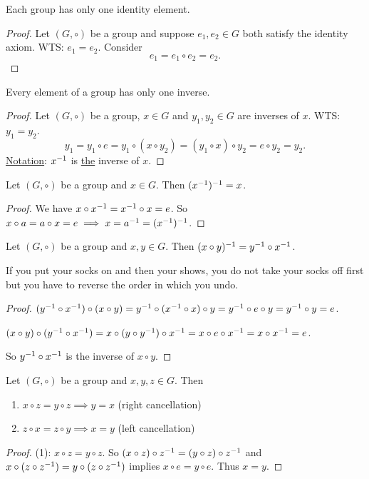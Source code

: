 \documentclass[]{article}
\begin{document}
\begin{proposition}
	Each group has only one identity element.
\end{proposition}
\begin{proof}
	Let $(G,\circ)$ be a group and suppose $e_1,e_2\in G$ both satisfy the identity axiom.
	WTS: $e_1 = e_2$.
	Consider $$e_1 = e_1\circ e_2 = e_2.$$
\end{proof}
\begin{proposition}
	Every element of a group has only one inverse.
\end{proposition}
\begin{proof}
	Let $(G,\circ)$ be a group, $x\in G$ and $y_1,y_2\in G$ are inverses of $x$.
	WTS: $y_1 = y_2$.
	$$y_1= y_1\circ e =y_1\circ (x\circ y_2) = (y_1\circ x)\circ y_2 = e\circ y_2 = y_2.$$
	\ul{Notation}: $x^{-1}$ is \ul{the} inverse of $x$.
\end{proof}
\begin{proposition}
	Let $(G,\circ)$ be a group and $x\in G$. Then $(x^{-1})^{-1} = x$.
\end{proposition}
\begin{proof}
	We have $x\circ x^{-1} = x^{-1} \circ x = e$. So $x\circ a = a\circ x = e \implies x = a^{-1} = (x^{-1})^{-1}$.
\end{proof}
\begin{proposition}
	Let $(G,\circ)$ be a group and $x,y\in G$. Then $(x\circ y)^{-1} = y^{-1} \circ x^{-1}$.
\end{proposition}
\begin{remark}
	If you put your socks on and then your shows, you do not take your socks off first but you have to reverse the order in which you undo.
\end{remark}
\begin{proof}
	$(y^{-1}\circ x^{-1})\circ(x\circ y) = y^{-1}\circ(x^{-1}\circ x)\circ y = y^{-1}\circ e\circ y = y^{-1}\circ y = e$.
	
	$(x\circ y)\circ(y^{-1}\circ x^{-1}) = x\circ(y\circ y^{-1})\circ x^{-1} = x\circ e\circ x^{-1} = x\circ x^{-1} = e$.

	So $y^{-1}\circ x^{-1}$ is the inverse of $x\circ y$.
\end{proof}
\begin{proposition}
	Let $(G,\circ)$ be a group and $x,y,z\in G$. Then
	\begin{enumerate}
		\item $x\circ z = y\circ z \implies y = x$ (right cancellation)
		\item $z\circ x = z\circ y \implies x = y$ (left cancellation)
	\end{enumerate}
\end{proposition}
\begin{proof}
	(1): $x\circ z = y\circ z$. So $(x\circ z)\circ z^{-1} = (y\circ z)\circ z^{-1}$ and $x\circ(z\circ z^{-1}) = y\circ(z\circ z^{-1})$ implies $x\circ e = y\circ e$. Thus $x = y$.
\end{proof}
\end{document}
